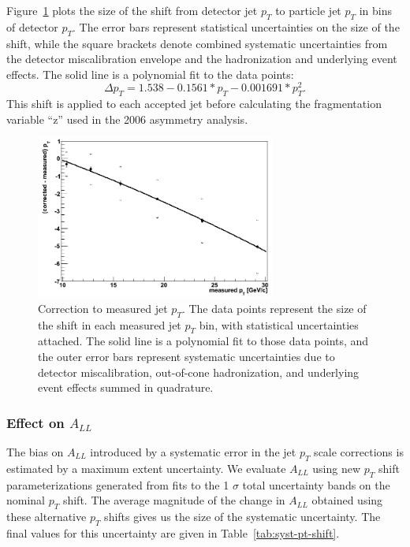 Figure~\ref{fig:jet-pt-shift} plots the size of the shift from detector jet
\(p_T\) to particle jet \(p_T\) in bins of detector \(p_T\). The error bars
represent statistical uncertainties on the size of the shift, while the square
brackets denote combined systematic uncertainties from the detector
miscalibration envelope and the hadronization and underlying event effects. The
solid line is a polynomial fit to the data points:
%
\begin{equation}
  \Delta p_T = 1.538 - 0.1561*p_T - 0.001691*p_T^2.
\end{equation}
%
This shift is applied to each accepted jet before calculating the fragmentation
variable ``z'' used in the 2006 asymmetry analysis.

\begin{figure}
  \centering
  \includegraphics[width=0.7\textwidth]{figures/jet-pt-shift}
  \caption{Correction to measured jet $p_T$.  The data points represent the size of the shift in each measured jet $p_T$ bin, with statistical uncertainties attached.  The solid line is a polynomial fit to those data points, and the outer error bars represent systematic uncertainties due to detector miscalibration, out-of-cone hadronization, and underlying event effects summed in quadrature.}
  \label{fig:jet-pt-shift}
\end{figure}

\subsubsection{Effect on $A_{LL}$}

The bias on \(A_{LL}\) introduced by a systematic error in the jet \(p_T\) scale
corrections is estimated by a maximum extent uncertainty. We evaluate \(A_{LL}\)
using new \(p_T\) shift parameterizations generated from fits to the 1 $\sigma$
total uncertainty bands on the nominal \(p_T\) shift. The average magnitude of
the change in \(A_{LL}\) obtained using these alternative \(p_T\) shifts gives
us the size of the systematic uncertainty. The final values for this uncertainty
are given in Table~\ref{tab:syst-pt-shift}.

